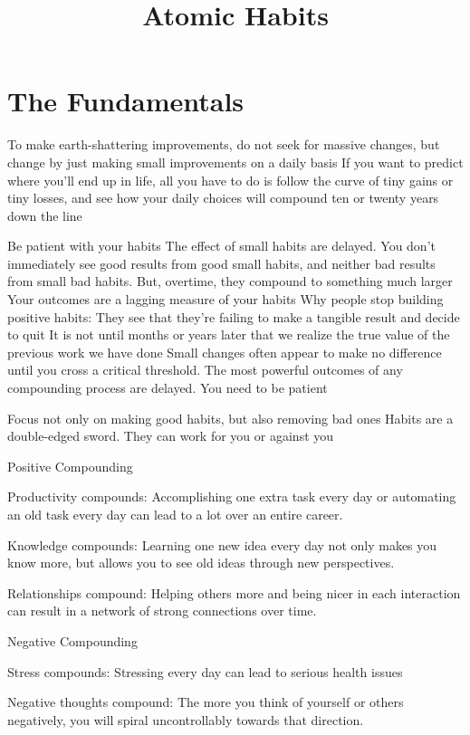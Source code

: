 \documentclass[10pt,twocolumn]{../notes}
\title{Atomic Habits}
\begin{document}
\maketitle
\tableofcontents
\section{The Fundamentals}
\Advice To make earth-shattering improvements, do not seek for massive changes, but change by just making small improvements on a daily basis
\Quote If you want to predict where you’ll end up in life, all you have to do is follow the curve of tiny gains or tiny losses, and see how your daily choices will compound ten or twenty years down the line

\Advice Be patient with your habits
\Fact The effect of small habits are delayed. You don’t immediately see good results from good small habits, and neither bad results from small bad habits. But, overtime, they compound to something much larger
\Quote Your outcomes are a lagging measure of your habits
\Fact Why people stop building positive habits: They see that they’re failing to make a tangible result and decide to quit
\Quote It is not until months or years later that we realize the true value of the previous work we have done
\Quote Small changes often appear to make no difference until you cross a critical threshold. The most powerful outcomes of any compounding process are delayed. You need to be patient


\Advice Focus not only on making good habits, but also removing bad ones
\Quote Habits are a double-edged sword. They can work for you or against you
\begin{List}{Positive Compounding}
\item Productivity compounds: Accomplishing one extra task every day or automating an old task every day can lead to a lot over an entire career.
\item Knowledge compounds: Learning one new idea every day not only makes you know more, but allows you to see old ideas through new perspectives.
\item Relationships compound: Helping others more and being nicer in each interaction can result in a network of strong connections over time.
\end{List}

\begin{List}{Negative Compounding}
\item Stress compounds: Stressing every day can lead to serious health issues
\item Negative thoughts compound: The more you think of yourself or others negatively, you will spiral uncontrollably towards that direction.
\end{List}
\end{document}

